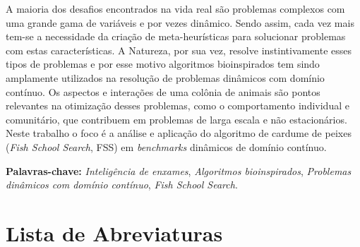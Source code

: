 
\bacharelado {}
\data {\today}



\ttorientador{$ $}
\ttexaminadorum{$ $}
\ttexaminadordois{$ $}

\newpage
\pagestyle{empty}

\maketitle



A maioria dos desafios encontrados na vida real são problemas complexos com uma grande gama de variáveis e por vezes dinâmico. Sendo assim, cada vez mais tem-se a necessidade da criação de meta-heurísticas para solucionar problemas com estas características. A Natureza, por sua vez, resolve instintivamente esses tipos de problemas e por esse motivo algoritmos bioinspirados tem sindo amplamente utilizados na resolução de problemas dinâmicos com domínio contínuo. Os aspectos e interações de uma colônia de animais são pontos relevantes na otimização desses problemas, como o comportamento individual e comunitário, que contribuem em problemas de larga escala e não estacionários. Neste trabalho o foco é a análise e aplicação do algoritmo de cardume de peixes (\textit{Fish School Search}, FSS) em \textit{benchmarks} dinâmicos de domínio contínuo.

\noindent \textbf{Palavras-chave:} \textit{Inteligência de enxames}, \textit{Algoritmos bioinspirados}, \textit{Problemas dinâmicos com domínio contínuo}, \textit{Fish School Search}.

\tableofcontents
\listoffigures
\listoftables
\newpage
\chapter*{Lista de Abreviaturas\hfill} 
\listofsymbols

\newpage
\pagestyle{myheadings}

